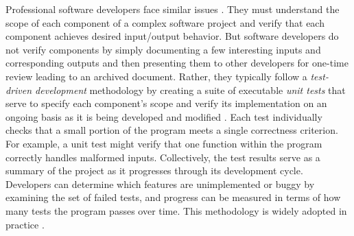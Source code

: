 \documentclass{frontiersSCNS}
\begin{document}





Professional software developers face similar issues \citep{omar_sciunit_2013}. 
They must understand the scope of each component of a complex software project and verify that each component achieves desired input/output behavior. 
But software developers do not verify components by simply documenting a few interesting inputs and corresponding outputs and then presenting them to other developers for one-time review leading to an archived document. 
Rather, they typically follow a \emph{test-driven development} methodology by creating a suite of executable \emph{unit tests} that serve to specify each component's scope and verify its implementation on an ongoing basis as it is being developed and modified \citep{beck2003}. 
Each test individually checks that a small portion of the program meets a single correctness criterion. 
For example, a unit test might verify that one function within the program correctly handles malformed inputs. 
Collectively, the test results serve as a summary of the project as it progresses through its development cycle. 
Developers can determine which features are unimplemented or buggy by examining the set of failed tests, and progress can be measured in terms of how many tests the program passes over time. 
This methodology is widely adopted in practice \citep{beck2003}.

\end{document}

